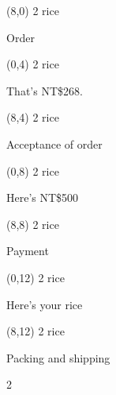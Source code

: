 \documentclass[a4paper]{article}
\newcommand{\mycard}[5]{%
	\small #1 #2
	\par
	\centering
	\parbox[t][6.8cm][c]{8.5cm}{%
	\Large#3\\
	\normalsize#4 #5
	}
}
\begin{document}
\begin{textblock}{8}(8,0)
\mycard{2}{rice}{Order}{}{} 
\end{textblock}

\begin{textblock}{8}(0,4)
\mycard{2}{rice}{That's NT\$268.}{}{} 
\end{textblock}

\begin{textblock}{8}(8,4)
\mycard{2}{rice}{Acceptance of order}{}{} 
\end{textblock}

\begin{textblock}{8}(0,8)
\mycard{2}{rice}{Here's NT\$500}{}{} 
\end{textblock}

\begin{textblock}{8}(8,8)
\mycard{2}{rice}{Payment}{}{} 
\end{textblock}

\begin{textblock}{8}(0,12)
\mycard{2}{rice}{Here's your rice}{}{} 
\end{textblock}

\begin{textblock}{8}(8,12)
\mycard{2}{rice}{Packing and shipping}{}{} 
\end{textblock}

2\\
\end{document}
